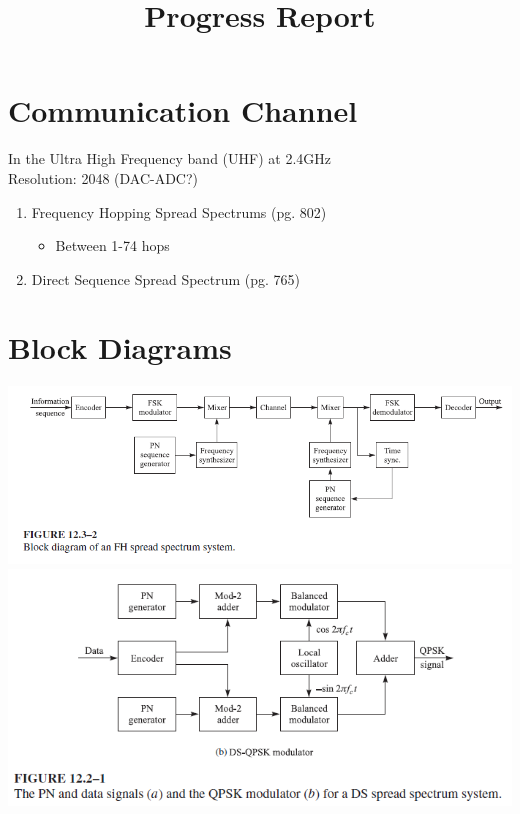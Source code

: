\documentclass{article}
\title{Progress Report}
\begin{document}
\section{Communication Channel}
In the Ultra High Frequency band (UHF) at 2.4GHz\\
Resolution: 2048 (DAC-ADC?)\\
\begin{enumerate}
\item Frequency Hopping Spread Spectrums (pg. 802)
    \begin{itemize}
    \item Between 1-74 hops
    \end{itemize}
\item Direct Sequence Spread Spectrum (pg. 765)
\end{enumerate}

\pagebreak
\section{Block Diagrams}
\includegraphics[width=\linewidth]{FHSS_Block_Diagram}
\includegraphics[width=\linewidth]{DSSS_Block_Diagram}
\end{document}
